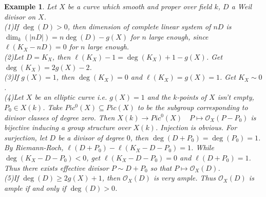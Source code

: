 \documentclass{ctexart}
\newtheorem{example}{Example}[section]
\begin{document}
\begin{example}
    Let $X$ be a curve which smooth and proper over field $k$, $D$ a Weil divisor on $X$. \\
    (1)If $\deg(D) > 0$, then dimension of complete linear system of $nD$ is $\dim_{k}(|nD|) = n\deg(D) - g(X)$ for $n$ large enough,
    since $\ell(K_{X} - nD) = 0$ for $n$ large enough. \\
    (2)Let $D = K_{X}$, then $\ell(K_{X}) - 1 = \deg(K_{X}) + 1 - g(X)$.
    Get $\deg(K_{X}) = 2g(X) - 2$. \\
    (3)If $g(X) = 1$, then $\deg(K_{X}) = 0$ and $\ell(K_{X}) = g(X) = 1$.
    Get $K_{X} \sim 0$. \\
    (4)Let $X$ be an elliptic curve i.e. $g(X) = 1$ and the $k$-points of $X$ isn't empty, $P_{0}\in X(k)$.
    Take $Pic^{0}(X) \subseteq Pic(X)$ to be the subgroup corresponding to divisor classes of degree zero.
    Then $X(k) \longrightarrow Pic^{0}(X)\quad P \longmapsto \mathcal{O}_{X}(P - P_{0})$ is bijective inducing a group structure over $X(k)$.
    Injection is obvious.
    For surjection, let $D$ be a divisor of degree $0$, then $\deg(D + P_{0}) = \deg(P_{0}) = 1$.
    By Riemann-Roch, $\ell(D + P_{0}) - \ell(K_{X} - D - P_{0}) = 1$.
    While $\deg(K_{X} - D - P_{0}) < 0$, get $\ell(K_{X} - D - P_{0}) = 0$ and $\ell(D + P_{0}) = 1$.
    Thus there exists effective divisor $P \sim D + P_{0}$ so that $P \longmapsto \mathcal{O}_{X}(D)$. \\
    (5)If $\deg(D) \ge 2g(X) + 1$, then $\mathcal{O}_{X}(D)$ is very ample.
    Thus $\mathcal{O}_{X}(D)$ is ample if and only if $\deg(D) > 0$.
\end{example}
\end{document}
